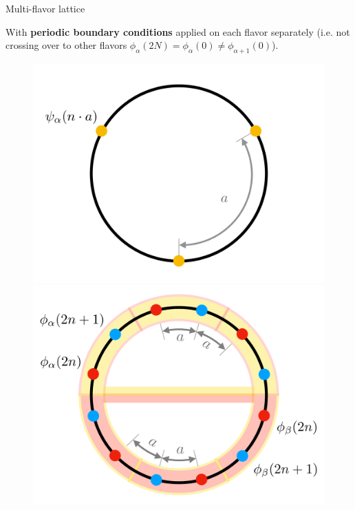 \begin{frame}[allowframebreaks]{Multi-flavor lattice}
\break

  With \textbf{periodic boundary conditions} applied on each flavor separately (i.e. not crossing over to other flavors $\phi_\alpha(2N) = \phi_\alpha(0) \neq \phi_{\alpha+1}(0)$).

  \begin{figure}[!tbp]
    \centering
    \begin{minipage}[c]{.45\linewidth}
      \centering
      \includegraphics[width=\linewidth]{Figures/chapter02/physical-fermion-lattice-flavor}
    \end{minipage}
    \hspace{.025\linewidth}
    \begin{minipage}[c]{.45\linewidth}
      \centering
      \includegraphics[width=\linewidth]{Figures/chapter02/computational-fermion-lattice-flavor}
    \end{minipage}
  \end{figure}


\end{frame}
